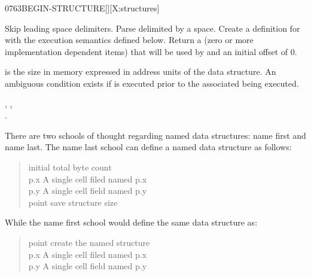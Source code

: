 \begin{worddef}{0763}{BEGIN-STRUCTURE}[][X:structures]
\item {}

	Skip leading space delimiters. Parse  delimited
	by a space. Create a definition for  with the
	execution semantics defined below.  Return a 
	(zero or more implementation dependent items) that will be
	used by  and an initial offset of 0.

\execute[name]

	 is the size in memory expressed in address units of
	the data structure.  An ambiguous condition exists if
	 is executed prior to the associated
	 being executed.

\see {},
	, \\
	.


	\begin{rationale} %
		There are two schools of thought regarding named data
		structures: name first and name last.  The name last
		school can define a named data structure as follows:

		\begin{quote} \tab[11.5]  initial total byte count \\
		   p.x	\tab {} A single cell filed named p.x \\
		   p.y   \tab {} A single cell field named p.y \\
		 point \tab[3.8]  save structure size
		\end{quote}

		While the name first school would define the same data
		structure as:

		\begin{quote}\ttfamily
		 point \tab[-.3]  create the named structure \\
		   p.x	\tab {} A single cell filed named p.x \\
		   p.y   \tab {} A single cell field named p.y \\
		\end{quote}


\end{rationale}
\end{worddef}
